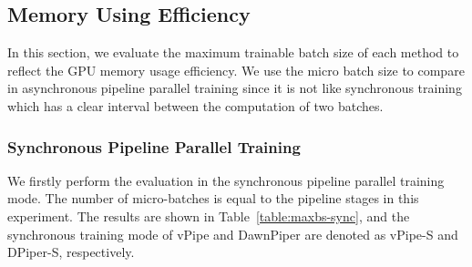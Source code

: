 \subsection{Memory Using Efficiency}
In this section, we evaluate the maximum trainable batch size of each method
to reflect the GPU memory usage efficiency.
We use the micro batch size to compare in asynchronous pipeline parallel training
since it is not like synchronous training which has a
clear interval between the computation of two batches.


\subsubsection{Synchronous Pipeline Parallel Training}
We firstly perform the evaluation in the synchronous pipeline parallel training mode.
The number of micro-batches is equal to the pipeline stages in this experiment.
The results are shown in Table~\ref{table:maxbs-sync},
and the synchronous training mode of vPipe and DawnPiper
are denoted as vPipe-S and DPiper-S, respectively.

